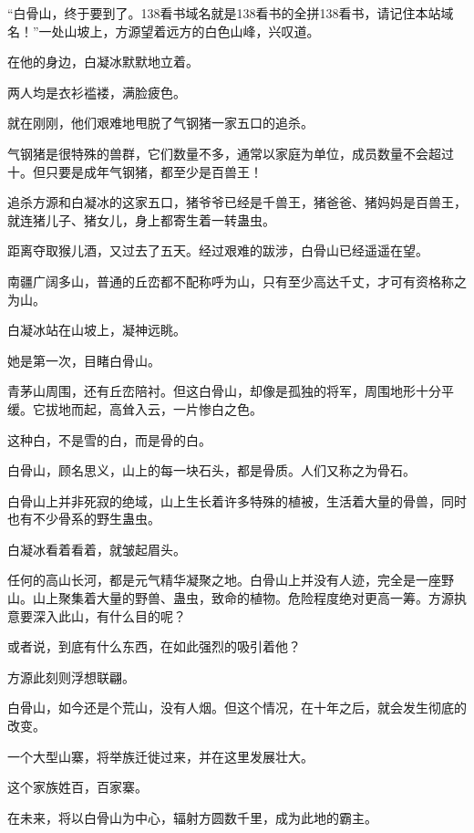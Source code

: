 
\begin{this_body}

“白骨山，终于要到了。138看书域名就是138看书的全拼138看书，请记住本站域名！”一处山坡上，方源望着远方的白色山峰，兴叹道。

在他的身边，白凝冰默默地立着。

两人均是衣衫褴褛，满脸疲色。

就在刚刚，他们艰难地甩脱了气钢猪一家五口的追杀。

气钢猪是很特殊的兽群，它们数量不多，通常以家庭为单位，成员数量不会超过十。但只要是成年气钢猪，都至少是百兽王！

追杀方源和白凝冰的这家五口，猪爷爷已经是千兽王，猪爸爸、猪妈妈是百兽王，就连猪儿子、猪女儿，身上都寄生着一转蛊虫。

距离夺取猴儿酒，又过去了五天。经过艰难的跋涉，白骨山已经遥遥在望。

南疆广阔多山，普通的丘峦都不配称呼为山，只有至少高达千丈，才可有资格称之为山。

白凝冰站在山坡上，凝神远眺。

她是第一次，目睹白骨山。

青茅山周围，还有丘峦陪衬。但这白骨山，却像是孤独的将军，周围地形十分平缓。它拔地而起，高耸入云，一片惨白之色。

这种白，不是雪的白，而是骨的白。

白骨山，顾名思义，山上的每一块石头，都是骨质。人们又称之为骨石。

白骨山上并非死寂的绝域，山上生长着许多特殊的植被，生活着大量的骨兽，同时也有不少骨系的野生蛊虫。

白凝冰看着看着，就皱起眉头。

任何的高山长河，都是元气精华凝聚之地。白骨山上并没有人迹，完全是一座野山。山上聚集着大量的野兽、蛊虫，致命的植物。危险程度绝对更高一筹。方源执意要深入此山，有什么目的呢？

或者说，到底有什么东西，在如此强烈的吸引着他？

方源此刻则浮想联翩。

白骨山，如今还是个荒山，没有人烟。但这个情况，在十年之后，就会发生彻底的改变。

一个大型山寨，将举族迁徙过来，并在这里发展壮大。

这个家族姓百，百家寨。

在未来，将以白骨山为中心，辐射方圆数千里，成为此地的霸主。


\end{this_body}
